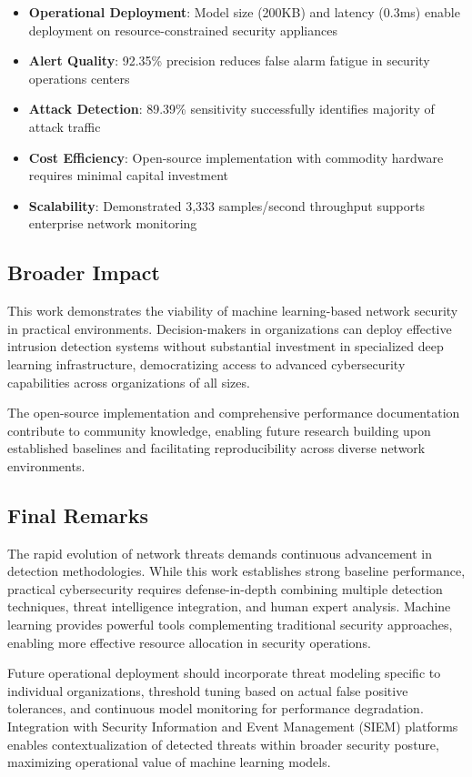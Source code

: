 \documentclass[conference]{IEEEtran}
\begin{document}
\begin{itemize}
    \item \textbf{Operational Deployment}: Model size (200KB) and latency (0.3ms) enable deployment on resource-constrained security appliances
    \item \textbf{Alert Quality}: 92.35\% precision reduces false alarm fatigue in security operations centers
    \item \textbf{Attack Detection}: 89.39\% sensitivity successfully identifies majority of attack traffic
    \item \textbf{Cost Efficiency}: Open-source implementation with commodity hardware requires minimal capital investment
    \item \textbf{Scalability}: Demonstrated 3,333 samples/second throughput supports enterprise network monitoring
\end{itemize}

\subsection{Broader Impact}

This work demonstrates the viability of machine learning-based network security in practical environments. Decision-makers in organizations can deploy effective intrusion detection systems without substantial investment in specialized deep learning infrastructure, democratizing access to advanced cybersecurity capabilities across organizations of all sizes.

The open-source implementation and comprehensive performance documentation contribute to community knowledge, enabling future research building upon established baselines and facilitating reproducibility across diverse network environments.

\subsection{Final Remarks}

The rapid evolution of network threats demands continuous advancement in detection methodologies. While this work establishes strong baseline performance, practical cybersecurity requires defense-in-depth combining multiple detection techniques, threat intelligence integration, and human expert analysis. Machine learning provides powerful tools complementing traditional security approaches, enabling more effective resource allocation in security operations.

Future operational deployment should incorporate threat modeling specific to individual organizations, threshold tuning based on actual false positive tolerances, and continuous model monitoring for performance degradation. Integration with Security Information and Event Management (SIEM) platforms enables contextualization of detected threats within broader security posture, maximizing operational value of machine learning models.
\end{document}
